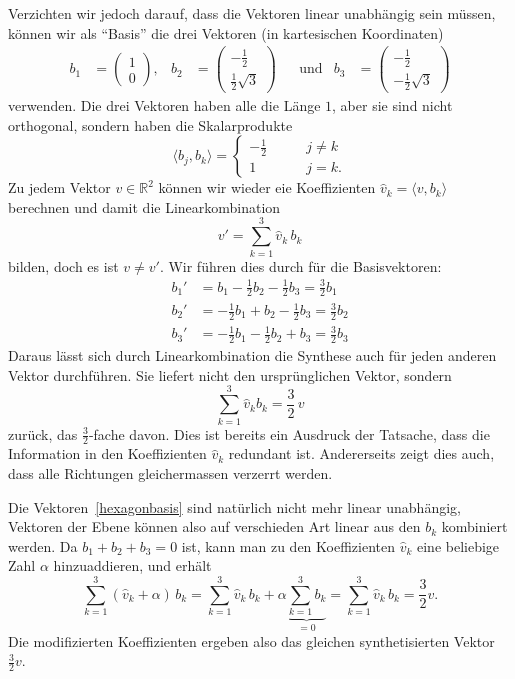 Verzichten wir jedoch darauf, dass die Vektoren linear unabhängig sein müssen,
können wir als ``Basis'' die drei Vektoren (in kartesischen Koordinaten)
\begin{equation}
\begin{aligned}
b_1
&=
\begin{pmatrix}1\\0\end{pmatrix},
&
b_2
&=
\begin{pmatrix}-\frac12\\\frac12\sqrt{3}\end{pmatrix}
&&\text{und}
&
b_3
&=
\begin{pmatrix}-\frac12\\-\frac12\sqrt{3}\end{pmatrix}
\end{aligned}
\label{hexagonbasis}
\end{equation}
verwenden.
Die drei Vektoren haben alle die Länge $1$, aber sie sind nicht
orthogonal, sondern haben die Skalarprodukte
\[
\langle b_j,b_k\rangle
=
\begin{cases}
-\frac12&\qquad j\ne k\\
1&\qquad j=k.
\end{cases}
\]
Zu jedem Vektor $v\in\mathbb R^2$ können wir wieder eie Koeffizienten
$\hat{v}_k=\langle v,b_k\rangle$ berechnen und damit die Linearkombination
\[
v' = \sum_{k=1}^3 \hat{v}_k\,b_k
\]
bilden,
doch es ist $v\ne v'$.
Wir führen dies durch für die Basisvektoren:
\begin{align*}
b_1'
&=
b_1 - \frac12 b_2 - \frac 12 b_3
=
\frac32b_1
\\
b_2'
&=
-\frac12 b_1 + b_2 -\frac12 b_3
=
\frac32b_2
\\
b_3'
&=
-\frac12b_1-\frac12 b_2 + b_3
=
\frac32b_3
\end{align*}
Daraus lässt sich durch Linearkombination die Synthese auch für jeden
anderen Vektor durchführen.
Sie liefert nicht den ursprünglichen Vektor, sondern
\begin{equation}
\sum_{k=1}^3 \hat{v}_k b_k = \frac32\,v
\label{geometrie:32beispiel}
\end{equation}
zurück, das $\frac32$-fache davon.
Dies ist bereits ein Ausdruck der Tatsache, dass die Information in den
Koeffizienten $\hat{v}_k$ redundant ist.
Andererseits zeigt dies auch, dass alle Richtungen gleichermassen
verzerrt werden.

Die Vektoren~\eqref{hexagonbasis}
sind natürlich nicht mehr linear unabhängig, Vektoren
der Ebene können also auf verschieden Art linear aus den $b_k$ kombiniert
werden.
Da $b_1+b_2+b_3=0$ ist, kann man zu den Koeffizienten $\hat{v}_k$
eine beliebige Zahl $\alpha$ hinzuaddieren, und erhält
\[
\sum_{k=1}^3 (\hat{v}_k+\alpha)\, b_k
=
\sum_{k=1}^3 \hat{v}_k\,b_k
+\alpha
\underbrace{ \sum_{k=1}^3 b_k}_{\displaystyle=0}
=
\sum_{k=1}^3 \hat{v}_k\,b_k
=
\frac32 v.
\]
Die modifizierten Koeffizienten ergeben also das gleichen synthetisierten
Vektor $\frac32 v$.

